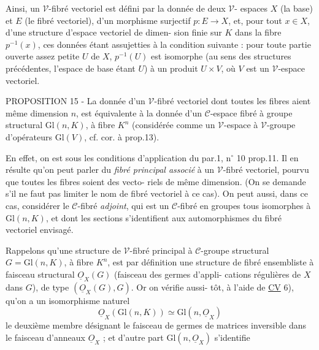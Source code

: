 \newpage



Ainsi, un $\mathcal{V}$-fibré vectoriel est défini par la donnée de deux $\mathcal{V}$-
espaces $X$ (la base) et $E$ (le fibré vectoriel), d'un morphisme surjectif
$p : E \to X$, et, pour tout $x \in X$, d'une structure d'espace vectoriel de dimen-
sion finie sur $K$ dans la fibre $p^{-1}(x)$, ces données étant assujetties à la
condition suivante : pour toute partie ouverte assez petite $U$ de $X$,
$p^{-1}(U)$ est isomorphe (au sens des structures précédentes, l'espace de base
étant $U$) à un produit $U \times V$, où $V$ est un $\mathcal{V}$-espace vectoriel.

PROPOSITION 15 - La donnée d'un $\mathcal{V}$-fibré vectoriel dont toutes les fibres
aient même dimension $n$, est équivalente à la donnée d'un $\mathcal{C}$-espace fibré
à groupe structural $\mathrm{Gl}(n, K)$, à fibre $K^n$ (considérée comme un $\mathcal{V}$-espace
à $\mathcal{V}$-groupe d'opérateurs $\mathrm{Gl}(V)$, cf. cor. à prop.13).

En effet, on est sous les conditions d'application du par.1, n$^\circ$ 10
prop.11. Il en résulte qu'on peut parler du \emph{fibré principal associé} à
un $\mathcal{V}$-fibré vectoriel, pourvu que toutes les fibres soient des vecto-
riels de même dimension. (On se demande s'il ne faut pas limiter le nom
de fibré vectoriel à ce cas). On peut aussi, dans ce cas, considérer le
$\mathcal{C}$-fibré \emph{adjoint}, qui est un $\mathcal{C}$-fibré en groupes tous isomorphes à
$\mathrm{Gl}(n, K)$, et dont les sections s'identifient aux automorphismes du fibré
vectoriel envisagé.

Rappelons qu'une structure de $\mathcal{V}$-fibré principal à $\mathcal{C}$-groupe
structural $G = \mathrm{Gl}(n, K)$, à fibre $K^n$, est par définition une structure de
fibré ensembliste à faisceau structural $\underline{O}_X(G)$ (faisceau des germes d'appli-
cations régulières de $X$ dans $G$), de type $(\underline{O}_X(G), G)$. Or on vérifie aussi-
tôt, à l'aide de \underline{CV} 6), qu'on a un isomorphisme naturel
$$
\underline{O}_X(\mathrm{Gl}(n, K)) \simeq \mathrm{Gl}(n, \underline{O}_X)
$$
le deuxième membre désignant le faisceau de germes de matrices inversible
dans le faisceau d'anneaux $\underline{O}_X$ ; et d'autre part $\mathrm{Gl}(n, \underline{O}_X)$ s'identifie

\newpage



